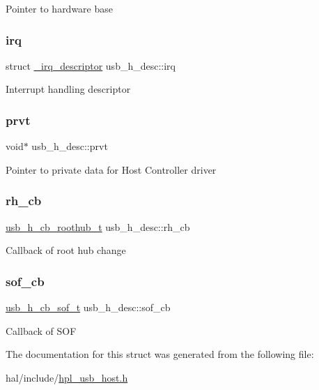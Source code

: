 Pointer to hardware base \mbox{\label{structusb__h__desc_af51d57cf25ab32e379c108388d0e5c70}} 
\subsubsection{\texorpdfstring{irq}{irq}}
{\footnotesize\ttfamily struct \hyperlink{struct__irq__descriptor}{\+\_\+irq\+\_\+descriptor} usb\+\_\+h\+\_\+desc\+::irq}

Interrupt handling descriptor \mbox{\label{structusb__h__desc_a49877672c7dfa8cc9cede4e9b7a0e362}} 
\subsubsection{\texorpdfstring{prvt}{prvt}}
{\footnotesize\ttfamily void$\ast$ usb\+\_\+h\+\_\+desc\+::prvt}

Pointer to private data for Host Controller driver \mbox{\label{structusb__h__desc_adeab338fa2a4dac953b4305b0b2defad}} 
\subsubsection{\texorpdfstring{rh\+\_\+cb}{rh\_cb}}
{\footnotesize\ttfamily \hyperlink{hpl__usb__host_8h_aee4ec1554da1298d8875cd8e789c058a}{usb\+\_\+h\+\_\+cb\+\_\+roothub\+\_\+t} usb\+\_\+h\+\_\+desc\+::rh\+\_\+cb}

Callback of root hub change \mbox{\label{structusb__h__desc_af861986e911d7479de24d5ff65cbc752}} 
\subsubsection{\texorpdfstring{sof\+\_\+cb}{sof\_cb}}
{\footnotesize\ttfamily \hyperlink{hpl__usb__host_8h_aa4342c321cc874eedaefdde86e06e6c3}{usb\+\_\+h\+\_\+cb\+\_\+sof\+\_\+t} usb\+\_\+h\+\_\+desc\+::sof\+\_\+cb}

Callback of S\+OF 

The documentation for this struct was generated from the following file\+:\begin{DoxyCompactItemize}
\item 
hal/include/\hyperlink{hpl__usb__host_8h}{hpl\+\_\+usb\+\_\+host.\+h}\end{DoxyCompactItemize}
